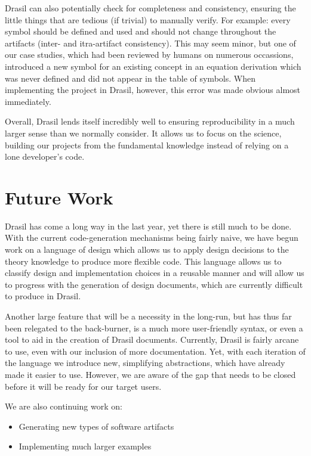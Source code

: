 \documentclass[sigconf]{acmart}
\begin{document}
Drasil can also potentially check for completeness and consistency, ensuring 
the little things that are tedious (if trivial) to manually verify. For 
example: every symbol should be defined and used and should not change 
throughout the artifacts (inter- and itra-artifact consistency). This may seem 
minor, but one of our case studies, which had been reviewed by humans on 
numerous occassions, introduced a new symbol for an existing concept in an 
equation derivation which was never defined and did not appear in the table of 
symbols. When implementing the project in Drasil, however, this error was made 
obvious almost immediately.

Overall, Drasil lends itself incredibly well to ensuring reproducibility in a 
much larger sense than we normally consider. It allows us to focus on the 
science, building our projects from the fundamental knowledge instead of 
relying on a lone developer's code.

\section{Future Work} \label{SecFuture}

Drasil has come a long way in the last year, yet there is still much to be 
done. With the current code-generation mechanisms being fairly naive, we have 
begun work on a language of design which allows us to apply design decisions to 
the theory knowledge to produce more flexible code. This language allows us to 
classify design and implementation choices in a reusable manner and will 
allow us to progress with the generation of design documents, which are 
currently difficult to produce in Drasil.

Another large feature that will be a necessity in the long-run, but has thus 
far been relegated to the back-burner, is a much more user-friendly syntax, or 
even a tool to aid in the creation of Drasil documents. Currently, Drasil is 
fairly arcane to use, even with our inclusion of more documentation. Yet, with 
each iteration of the language we introduce new, simplifying abstractions, 
which have already made it easier to use. However, we are aware of the gap that 
needs to be closed before it will be ready for our target users.

We are also continuing work on:
\begin{itemize}
	\item Generating new types of software artifacts
	\item Implementing much larger examples
\end{itemize}
\end{document}

